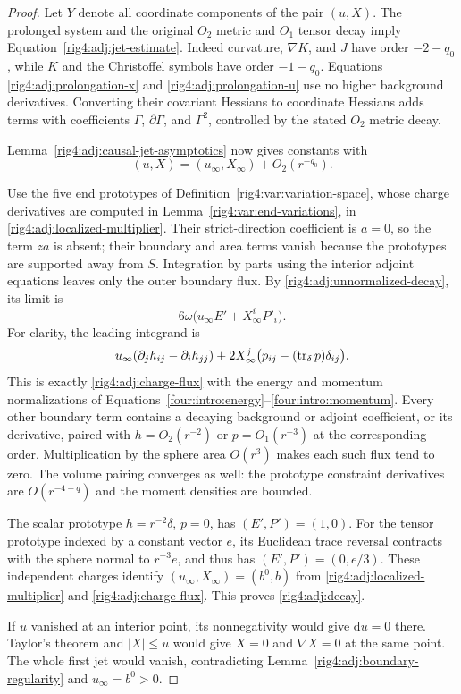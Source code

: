 \begin{proof}
Let $Y$ denote all coordinate components of the pair $(u,X)$.  The prolonged
system and the original $O_2$ metric and $O_1$ tensor decay imply
Equation~\eqref{rig4:adj:jet-estimate}.
Indeed curvature, $\nabla K$, and $J$ have order $-2-q_0$, while $K$ and
the Christoffel symbols have order $-1-q_0$.  Equations
\eqref{rig4:adj:prolongation-x} and \eqref{rig4:adj:prolongation-u} use no higher
background derivatives.  Converting their covariant Hessians to coordinate
Hessians adds terms with coefficients $\Gamma$, $\partial\Gamma$, and
$\Gamma^2$, controlled by the stated $O_2$ metric decay.

Lemma~\ref{rig4:adj:causal-jet-asymptotics} now gives constants with
\begin{equation}
 (u,X)=(u_\infty,X_\infty)+O_2(r^{-q_0}).
 \label{rig4:adj:unnormalized-decay}
\end{equation}

Use the five end prototypes of Definition~\ref{rig4:var:variation-space},
whose charge derivatives are computed in Lemma~\ref{rig4:var:end-variations}, in
\eqref{rig4:adj:localized-multiplier}.  Their strict-direction coefficient is
$a=0$, so the term $za$ is absent; their boundary and area terms vanish
because the prototypes are supported away from $S$.  Integration by parts
using the interior adjoint equations leaves only the outer boundary flux.
By \eqref{rig4:adj:unnormalized-decay}, its limit is
\begin{equation}
 6\omega\bigl(u_\infty E'+X_\infty^iP'_i\bigr).
 \label{rig4:adj:charge-flux}
\end{equation}
For clarity, the leading integrand is
\[
 u_\infty(\partial_jh_{ij}-\partial_i h_{jj})
 +2X_\infty^j\bigl(p_{ij}-(\operatorname{tr}_\delta p)\delta_{ij}\bigr).
\]
This is exactly \eqref{rig4:adj:charge-flux} with the energy and momentum
normalizations of Equations~\eqref{four:intro:energy}--\eqref{four:intro:momentum}.  Every other boundary term
contains a decaying background or adjoint coefficient, or its derivative,
paired with $h=O_2(r^{-2})$ or $p=O_1(r^{-3})$ at the corresponding order.
Multiplication by the sphere area $O(r^3)$ makes each such flux tend to zero.
The volume pairing converges as well: the prototype constraint derivatives
are $O(r^{-4-q})$ and the moment densities are bounded.

The scalar prototype $h=r^{-2}\delta$, $p=0$, has $(E',P')=(1,0)$.
For the tensor prototype indexed by a constant vector $e$, its Euclidean
trace reversal contracts with the sphere normal to $r^{-3}e$, and thus has
$(E',P')=(0,e/3)$.  These independent charges identify
$(u_\infty,X_\infty)=(b^0,b)$ from \eqref{rig4:adj:localized-multiplier} and
\eqref{rig4:adj:charge-flux}.  This proves \eqref{rig4:adj:decay}.

If $u$ vanished at an interior point, its nonnegativity would give
$\mathrm du=0$ there.  Taylor's theorem and $|X|\le u$ would give
$X=0$ and $\nabla X=0$ at the same point.  The whole first jet would vanish,
contradicting Lemma~\ref{rig4:adj:boundary-regularity} and $u_\infty=b^0>0$.
\end{proof}

